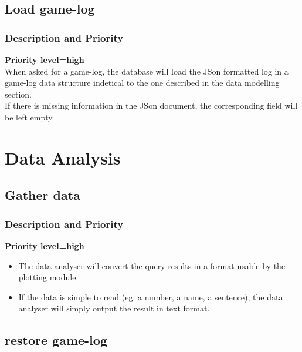 \documentclass{scrreprt}
\begin{document}
\subsection{Load game-log}
\subsubsection{Description and Priority}
\textbf{Priority level=high}\\
When asked for a game-log, the database will load the JSon formatted log in a game-log data structure indetical to the one described in the data modelling section.\\
If there is missing information in the JSon document, the corresponding field will be left empty.



\section{Data Analysis}


\subsection{Gather data}
\subsubsection{Description and Priority}
\textbf{Priority level=high}\\
\begin{itemize}
\item The data analyser will convert the query results in a format usable by the plotting module.
\item If the data is simple to read (eg: a number, a name, a sentence), the data analyser will simply output the result in text format.
  \end{itemize}

\subsection{restore game-log}
\end{document}
